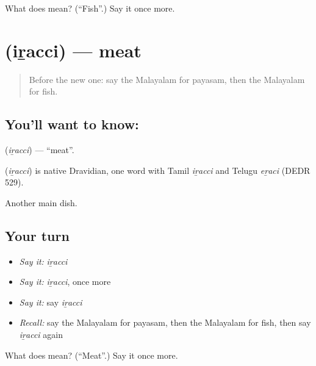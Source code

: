 \begin{tcolorbox}[breakable,colback=teal!4,colframe=teal!35!black,title={Before you move on}]
What does  mean? (\textquotedblleft{}Fish\textquotedblright{}.) Say it once more.
\end{tcolorbox}
\section[\texorpdfstring{\ml{ഇറച്ചി} (iṟacci)}{ഇറച്ചി (iṟacci)}]{ (iṟacci) — meat}

\label{lesson:ML-C131-meat}



\begin{quote}
Before the new one: say the Malayalam for payasam, then the Malayalam for fish.
\end{quote}

\subsection*{You'll want to know: }
\textbf{} (\emph{iṟacci}) — \textquotedblleft{}meat\textquotedblright{}.

\begin{cousinweb}
\textbf{} (\emph{iṟacci}) is native Dravidian, one word with Tamil \emph{iṟacci} and Telugu \emph{eṟaci} (DEDR 529).
\end{cousinweb}

\begin{grammarlens}[title={What you've built}]
Another main dish.
\end{grammarlens}

\subsection*{Your turn}
\begin{itemize}
\raggedright
  \item \emph{Say it:} \emph{iṟacci}
  \item \emph{Say it:} \emph{iṟacci}, once more
  \item \emph{Say it:} say \emph{iṟacci}
  \item \emph{Recall:} say the Malayalam for payasam, then the Malayalam for fish, then say \emph{iṟacci} again
\end{itemize}

\begin{tcolorbox}[breakable,colback=teal!4,colframe=teal!35!black,title={Before you move on}]
What does  mean? (\textquotedblleft{}Meat\textquotedblright{}.) Say it once more.
\end{tcolorbox}
